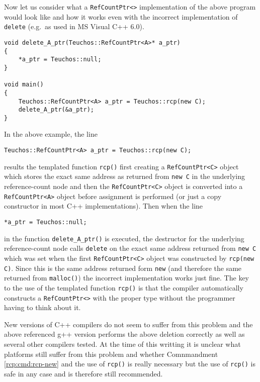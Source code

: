 Now let us consider what a \texttt{RefCountPtr<>} implementation of
the above program would look like and how it works even with the
incorrect implementation of \texttt{delete} (e.g.~as used in MS Visual
C++ 6.0).

{\small\begin{verbatim}
void delete_A_ptr(Teuchos::RefCountPtr<A>* a_ptr)
{
    *a_ptr = Teuchos::null;
}

void main()
{
    Teuchos::RefCountPtr<A> a_ptr = Teuchos::rcp(new C);
    delete_A_ptr(&a_ptr);
}
\end{verbatim}}

In the above example, the line
%
{\small\begin{verbatim}
Teuchos::RefCountPtr<A> a_ptr = Teuchos::rcp(new C);
\end{verbatim}}
%
\noindent{}results the templated function \texttt{rcp()}
first creating a \texttt{RefCountPtr<C>} object which stores the exact
same address as returned from \texttt{new C} in the underlying
reference-count node and then the \texttt{RefCountPtr<C>} object is
converted into a \texttt{RefCountPtr<A>} object before assignment is
performed (or just a copy constructor in most C++ implementations).
Then when the line
%
{\small\begin{verbatim}
*a_ptr = Teuchos::null;
\end{verbatim}}
%
\noindent{}in the function \texttt{delete\_A\_ptr()} is executed,
the destructor for the underlying reference-count node calls
\texttt{delete} on the exact same address returned from \texttt{new C}
which was set when the first \texttt{RefCountPtr<C>} object was
constructed by \texttt{rcp(new C)}.  Since this is the same address
returned form \texttt{new} (and therefore the same returned from
\texttt{malloc()}) the incorrect implementation works just fine.
The key to the use of the templated function \texttt{rcp()} is that
the compiler automatically constructs a \texttt{RefCountPtr<>} with
the proper type without the programmer having to think about it.

New versions of C++ compilers do not seem to suffer from this problem
and the above referenced g++ version performs the above deletion
correctly as well as several other compilers tested.  At the time of
this writting it is unclear what platforms still suffer from this
problem and whether Comnmandment \ref{rcp:cmd:rcp-new} and the use of
\texttt{rcp()} is really necessary but the use of \texttt{rcp()} is
safe in any case and is therefore still recommended.
